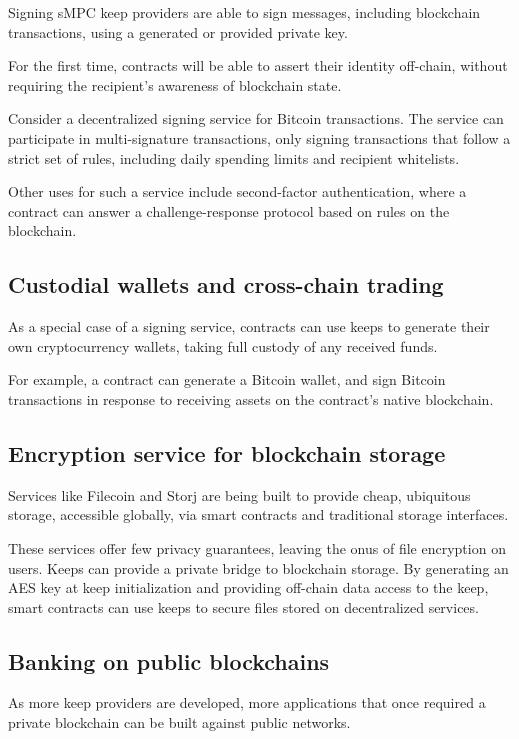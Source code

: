 \documentclass[11pt]{article}
\begin{document}
Signing sMPC keep providers are able to sign messages, including
blockchain transactions, using a generated or provided private key.

For the first time, contracts will be able to assert their identity
off-chain, without requiring the recipient's awareness of blockchain
state.

Consider a decentralized signing service for Bitcoin transactions. The
service can participate in multi-signature transactions, only signing
transactions that follow a strict set of rules, including daily
spending limits and recipient whitelists.

Other uses for such a service include second-factor authentication,
where a contract can answer a challenge-response protocol based on
rules on the blockchain.

\subsection{Custodial wallets and cross-chain trading}

As a special case of a signing service, contracts can use keeps to
generate their own cryptocurrency wallets, taking full custody of any
received funds.

For example, a contract can generate a Bitcoin wallet, and sign
Bitcoin transactions in response to receiving assets on the contract's
native blockchain.

\subsection{Encryption service for blockchain storage}

Services like Filecoin \cite{filecoin} and Storj \cite{storj} are
being built to provide cheap, ubiquitous storage, accessible globally,
via smart contracts and traditional storage interfaces.

These services offer few privacy guarantees, leaving the onus of file
encryption on users. Keeps can provide a private bridge to blockchain
storage. By generating an AES key at keep initialization and providing
off-chain data access to the keep, smart contracts can use keeps to
secure files stored on decentralized services.

\subsection{Banking on public blockchains}

As more keep providers are developed, more applications that once
required a private blockchain can be built against public networks.
\end{document}
